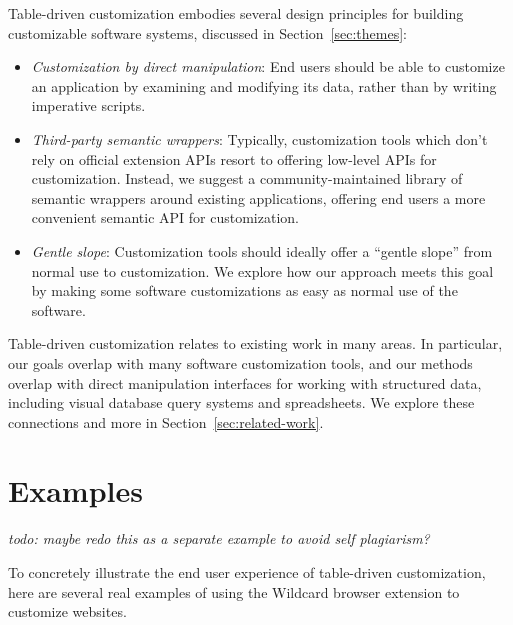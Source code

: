 \documentclass[sigplan,10pt,anonymous,review]{acmart}
\providecommand{\tightlist}{%
  \setlength{\itemsep}{0pt}\setlength{\parskip}{0pt}}
\begin{document}
Table-driven customization embodies several design principles for
building customizable software systems, discussed in
Section~\ref{sec:themes}:

\begin{itemize}
\tightlist
\item
  \emph{Customization by direct manipulation}: End users should be able
  to customize an application by examining and modifying its data,
  rather than by writing imperative scripts.
\item
  \emph{Third-party semantic wrappers}: Typically, customization tools
  which don't rely on official extension APIs resort to offering
  low-level APIs for customization. Instead, we suggest a
  community-maintained library of semantic wrappers around existing
  applications, offering end users a more convenient semantic API for
  customization.
\item
  \emph{Gentle slope}: Customization tools should ideally offer a
  ``gentle slope'' from normal use to customization. We explore how our
  approach meets this goal by making some software customizations as
  easy as normal use of the software.
\end{itemize}

Table-driven customization relates to existing work in many areas. In
particular, our goals overlap with many software customization tools,
and our methods overlap with direct manipulation interfaces for working
with structured data, including visual database query systems and
spreadsheets. We explore these connections and more in
Section~\ref{sec:related-work}.

\hypertarget{sec:examples}{%
\section{Examples}\label{sec:examples}}

\emph{todo: maybe redo this as a separate example to avoid self
plagiarism?}

To concretely illustrate the end user experience of table-driven
customization, here are several real examples of using the Wildcard
browser extension to customize websites.
\end{document}
